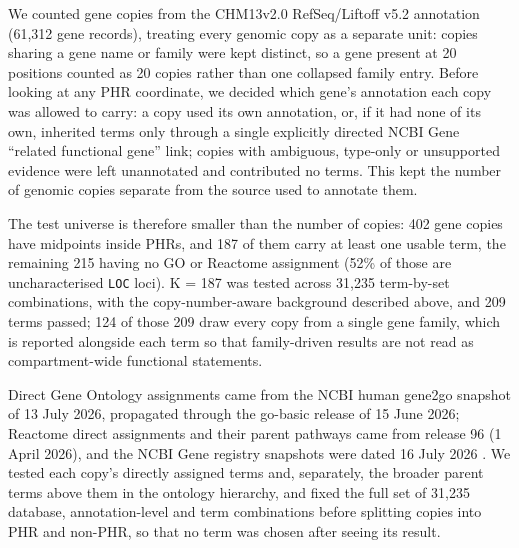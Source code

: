 \documentclass[pdflatex,mathphys]{jnl}
\begin{document}
We counted gene copies from the CHM13v2.0 RefSeq/Liftoff v5.2 annotation
(61,312 gene records), treating every genomic copy as a separate unit: copies
sharing a gene name or family were kept distinct, so a gene present at 20
positions counted as 20 copies rather than one collapsed family entry. Before
looking at any PHR coordinate, we decided which gene's annotation each copy was
allowed to carry: a copy used its own annotation, or, if it had none of its own,
inherited terms only through a single explicitly directed NCBI Gene ``related
functional gene'' link; copies with ambiguous, type-only or unsupported evidence
were left unannotated and contributed no terms. This kept the number of genomic
copies separate from the source used to annotate them.

The test universe is therefore smaller than the number of copies: 402 gene copies
have midpoints inside PHRs, and 187 of them carry at least one usable term, the
remaining 215 having no GO or Reactome assignment (52\% of those are
uncharacterised \texttt{LOC} loci). K = 187 was tested across 31{,}235
term-by-set combinations, with the copy-number-aware background described above,
and 209 terms passed; 124 of those 209 draw every copy from a single gene family,
which is reported alongside each term so that family-driven results are not read
as compartment-wide functional statements.

Direct Gene Ontology assignments came from the NCBI human gene2go snapshot of 13
July 2026, propagated through the go-basic release of 15 June 2026; Reactome
direct assignments and their parent pathways came from release 96 (1 April
2026), and the NCBI Gene registry snapshots were dated 16 July 2026
\cite{GeneOntologyAshburner2000,GeneOntologyConsortium2026,Reactome2024}. We
tested each copy's directly assigned terms and, separately, the broader parent
terms above them in the ontology hierarchy, and fixed the full set of 31,235
database, annotation-level and term combinations before splitting copies into
PHR and non-PHR, so that no term was chosen after seeing its result.
\end{document}
